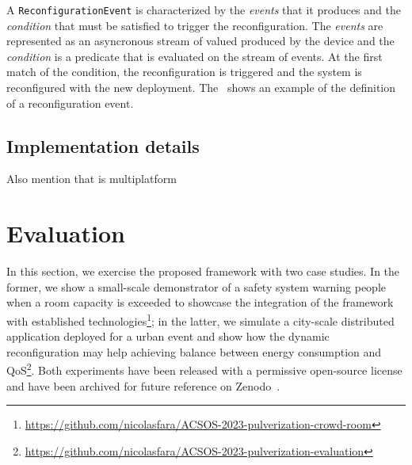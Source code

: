 \documentclass[conference]{IEEEtran}
\begin{document}


A \texttt{ReconfigurationEvent} is characterized by the \emph{events}
that it produces and the \emph{condition} that must be satisfied to trigger the reconfiguration.
%
The \emph{events} are represented as an asyncronous stream of valued produced by the device and the
\emph{condition} is a predicate that is evaluated on the stream of events.
%
At the first match of the condition, the reconfiguration is triggered and the system is reconfigured with the new deployment.
%
The~ shows an example of the definition of a reconfiguration event.



\subsection{Implementation details}

Also mention that is multiplatform

\section{Evaluation}\label{sec:evaluation}

In this section,
we exercise the proposed framework with two case studies.
%
In the former,
we show a small-scale demonstrator of a safety system warning people when a room capacity is exceeded
to showcase the integration of the framework with established technologies\footnote{
    \url{https://github.com/nicolasfara/ACSOS-2023-pulverization-crowd-room}
};
in the latter,
we simulate a city-scale distributed application deployed for a urban event
and show how the dynamic reconfiguration may help achieving balance between energy consumption and QoS\footnote{
    \url{https://github.com/nicolasfara/ACSOS-2023-pulverization-evaluation}
}.
%
Both experiments have been released with a permissive open-source license and have been archived for future reference on Zenodo~\cite{TBD}.
\end{document}
